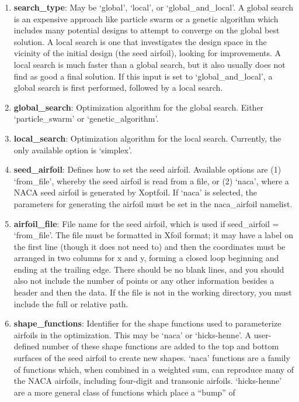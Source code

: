 \documentclass[11pt]{article}
\begin{document}
\begin{enumerate}
\item{\textbf{search\_type}: May be `global', `local', or `global\_and\_local'.
A global search is an expensive approach like particle swarm or a genetic algorithm which
includes many potential designs to attempt to converge on the global best solution.  A
local search is one that investigates the design space in the vicinity of the initial
design (the seed airfoil), looking for improvements.  A local search is much faster than
a global search, but it also usually does not find as good a final solution.  If this
input is set to `global\_and\_local', a global search is first performed, followed by a
local search.}
\item{\textbf{global\_search}: Optimization algorithm for the global search.  Either
`particle\_swarm' or `genetic\_algorithm'.}
\item{\textbf{local\_search}: Optimization algorithm for the local search.  Currently, the
only available option is `simplex'.}
\item{\textbf{seed\_airfoil}: Defines how to set the seed airfoil.  Available options are
(1) `from\_file', whereby the seed airfoil is read from a file, or (2) `naca', where a
NACA seed airfoil is generated by Xoptfoil. If `naca' is selected, the parameters for
generating the airfoil must be set in the naca\_airfoil namelist.}
\item{\textbf{airfoil\_file}: File name for the seed airfoil, which is used if
seed\_airfoil = `from\_file'.  The file must be formatted in Xfoil format; it may have a
label on the first line (though it does not need to) and then the coordinates must be
arranged in two columns for x and y, forming a closed loop beginning and ending at the
trailing edge. There should be no blank lines, and you should also not include the number
of points or any other information besides a header and then the data.  If the file is not 
in the working directory, you must include the full or relative path.}
\item{\textbf{shape\_functions}: Identifier for the shape functions used to parameterize
airfoils in the optimization.  This may be `naca' or `hicks-henne'.  A user-defined number
of these shape functions are added to the top and bottom surfaces of the seed airfoil to
create new shapes.  `naca' functions are a family of functions which, when combined in a
weighted sum, can reproduce many of the NACA airfoils, including four-digit and transonic
airfoils.  `hicks-henne' are a more general class of functions which place a ``bump'' of
}
\end{enumerate}
\end{document}
